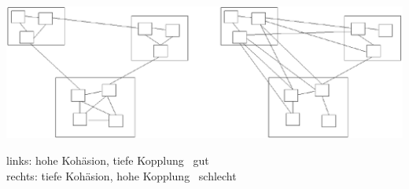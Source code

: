
\begin{center}
    \includegraphics[width=0.9\columnwidth]{images/modulaisierung_bsp.png}
\end{center}

\vspace{-0.2cm}

links: hohe Kohäsion, tiefe Kopplung \textrightarrow\ gut \\
rechts: tiefe Kohäsion, hohe Kopplung \textrightarrow\ schlecht

